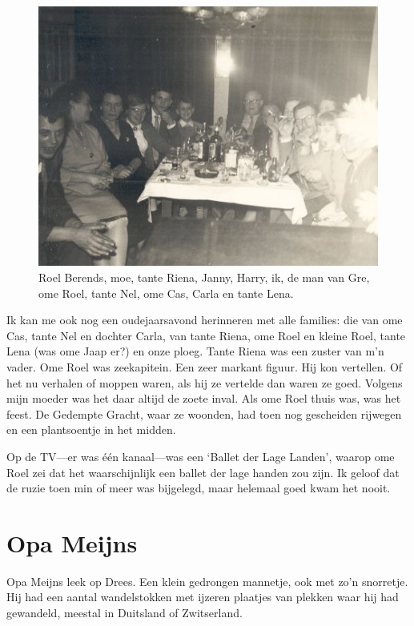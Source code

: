 \documentclass[10pt,twoside, openright]{memoir}
\begin{document}
\begin{figure}
\includegraphics[width=\textwidth]{img/ch1/oudnieuw}
\caption*{\footnotesize Roel Berends, moe, tante Riena, Janny, Harry, ik, de man van Gre, ome Roel, tante Nel, ome Cas, Carla en tante Lena.}
\end{figure} 

Ik kan me ook nog een oudejaarsavond herinneren met alle families: die van ome Cas, tante Nel en dochter Carla, van tante Riena, ome Roel en kleine Roel, tante Lena (was ome Jaap er?) en onze ploeg. Tante Riena was een zuster van m’n vader. Ome Roel was zeekapitein. Een zeer markant figuur. Hij kon vertellen. Of het nu verhalen of moppen waren, als hij ze vertelde dan waren ze goed. Volgens mijn moeder was het daar altijd de zoete inval. Als ome Roel thuis was, was het feest. De Gedempte Gracht, waar ze woonden, had toen nog gescheiden rijwegen en een plantsoentje in het midden. 

Op de TV---er was één kanaal---was een `Ballet der Lage Landen', waarop ome Roel zei dat het waarschijnlijk een ballet der lage handen zou zijn. Ik geloof dat de ruzie toen min of meer was bijgelegd, maar helemaal goed kwam het nooit.  



\section{Opa Meijns} %
\label{cha:opa_meijns}

Opa Meijns leek op Drees. Een klein gedrongen mannetje, ook met zo’n snorretje. Hij had een aantal wandelstokken met ijzeren plaatjes van plekken waar hij had gewandeld, meestal in Duitsland of Zwitserland.
\end{document}
